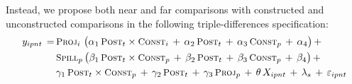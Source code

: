 \documentclass[12pt]{article}
\begin{document}
Instead, we propose both near and far comparisons with constructed and unconstructed comparisons in the following triple-differences specification:
\begin{align*}\label{eq:main}
\quad y_{ipnt} \, =& \,   \textsc{\small Proj}_{i} \,\, \big( \alpha_1 \, \textsc{\small Post}_{t}\times\textsc{\small Const}_{i} \, + \, \alpha_2 \, \textsc{\small Post}_{t} \, + \, \alpha_3 \, \textsc{\small Const}_{p}\, +\, \alpha_4 \big) \, + \\
& \, \textsc{\small Spill}_{p} \, \big( \beta_1 \, \textsc{\small Post}_{t}\times\textsc{\small Const}_{p} \, + \, \beta_2 \, \textsc{\small Post}_{t} \, + \, \beta_3 \, \textsc{\small Const}_{p} \, +\, \beta_4 \big) \, + \\
& \, \gamma_1 \,  \textsc{\small Post}_{t}\times\textsc{\small Const}_{p} \, + \, \gamma_2 \,\textsc{\small Post}_{t} \, + \, \gamma_3 \,  \textsc{\small Proj}_{p} \, + \, \theta \, X_{ipnt} \, + \, \lambda_s \, + \, \varepsilon_{ipnt} \quad 
\end{align*}
\end{document}
